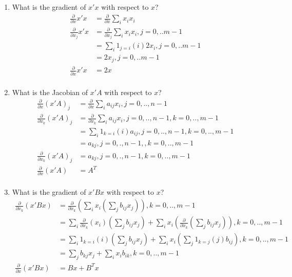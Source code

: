 \documentclass[12pt,letter]{article}
\begin{document}
\begin{enumerate}
\item What is the gradient of $x'x$ with respect to $x$?
  \begin{align*}
    \frac{\partial}{\partial x} x'x &= \frac{\partial}{\partial x} \sum_i x_i x_i\\
    \frac{\partial}{\partial x_j} x'x &= \frac{\partial}{\partial x_j} \sum_i x_i x_i, j =0,..m-1\\
                                    &= \sum_i 1_{j=i}(i)2x_i, j =0,..m-1\\
                                    &= 2x_j, j =0,..m-1\\
    \frac{\partial}{\partial x} x'x &= 2x\\
  \end{align*}
\item What is the Jacobian of $x'A$ with respect to $x$?
  \begin{align*}
    \frac{\partial}{\partial x} (x'A)_j &= \frac{\partial}{\partial x} \sum_i a_{ij} x_i, j =0,..,n-1\\
    \frac{\partial}{\partial x_k} (x'A)_j &= \frac{\partial}{\partial x_k} \sum_i a_{ij} x_i, j =0,..,n-1, k=0,..,m-1\\
                                        &= \sum_i 1_{k=i}(i) a_{ij}, j =0,..,n-1, k=0,..,m-1\\
                                        &= a_{kj}, j =0,.,n-1, ,k=0,..,m-1\\
    \frac{\partial}{\partial x_k} (x'A)_j &= a_{kj}, j =0,.,n-1, k=0,..,m-1\\
    \frac{\partial}{\partial x} (x'A) &= A^T\\
  \end{align*}
\item What is the gradient of $x'Bx$ with respect to $x$?
  \begin{align*}
    \frac{\partial}{\partial x_k} (x'Bx)&= \frac{\partial}{\partial x_k}(\sum_i x_i (\sum_j b_{ij}x_j)), k=0,..,m-1\\
                                        &= \sum_i \frac{\partial}{\partial x_k}(x_i) (\sum_j b_{ij}x_j) + \sum_i x_i (\frac{\partial}{\partial x_k}(\sum_j b_{ij}x_j)), k =0,..,m-1\\
                                        &= \sum_i 1_{k=i}(i) (\sum_j b_{ij}x_j) + \sum_i x_i (\sum_j 1_{k=j}(j)b_{ij}), k =0,..,m-1\\
                                        &= \sum_j b_{kj}x_j + \sum_i x_i b_{ik}, k =0,..,m-1\\
    \frac{\partial}{\partial x} (x'Bx)&= Bx + B^Tx
  \end{align*}
\end{enumerate}
\end{document}
